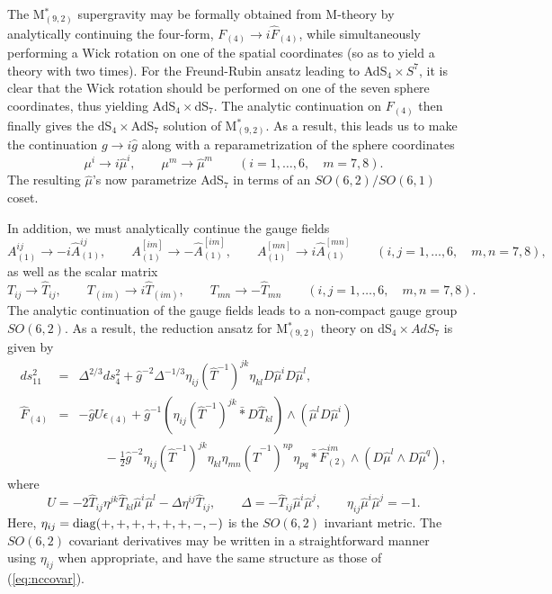 \documentclass[a4paper,12pt]{article}
\begin{document}
The M$^*_{(9,2)}$ supergravity may be formally obtained from M-theory by
analytically continuing the four-form, $F_{(4)}\to i\hat F_{(4)}$, while
simultaneously performing a Wick rotation on one of the spatial
coordinates (so as to yield a theory with two times).  For the
Freund-Rubin ansatz leading to AdS$_4\times S^7$, it is clear that the
Wick rotation should be performed on one of the seven sphere
coordinates, thus yielding AdS$_4\times$dS$_7$.  The analytic
continuation on $F_{(4)}$ then finally gives the dS$_4\times$AdS$_7$
solution of M$^*_{(9,2)}$.  As a result, this leads us to make the
continuation $g\to i\hat g$ along with a reparametrization of the sphere
coordinates
%
\begin{equation}
\mu^i\to i\hat \mu^i,\qquad \mu^m\to\hat\mu^m\qquad
(i=1,\ldots,6,\quad m=7,8).
\end{equation}
%
The resulting $\hat\mu$'s now parametrize AdS$_7$ in terms of an
$SO(6,2)/SO(6,1)$ coset.

In addition, we must analytically continue the gauge fields
%
\begin{equation}
A_{(1)}^{ij}\to -i\hat A_{(1)}^{ij},\qquad
A_{(1)}^{[im]}\to -\hat A_{(1)}^{[im]},\qquad
A_{(1)}^{[mn]}\to i\hat A_{(1)}^{[mn]}\qquad
(i,j=1,\ldots,6,\quad m,n=7,8),
\end{equation}
%
as well as the scalar matrix
%
\begin{equation}
T_{ij}\to \hat T_{ij},\qquad
T_{(im)}\to i\hat T_{(im)},\qquad
T_{mn}\to-\hat T_{mn}\qquad (i,j=1,\ldots,6, \quad m,n=7,8).
\end{equation}
%
The analytic continuation of the gauge fields leads to a non-compact
gauge group $SO(6,2)$.  As a result, the reduction ansatz for
M$^*_{(9,2)}$ theory on dS$_4\times AdS_7$ is given by
%
\begin{eqnarray}
ds^2_{11}&=&\Delta^{2/3}ds_4^2+\hat{g}^{-2}\Delta^{-1/3}
\eta_{ij}(\hat T^{-1})^{jk}\eta_{kl}D\hat\mu^{i}D\hat\mu^{l},\nonumber\\
\hat{F}_{(4)}&=&-\hat{g}U\epsilon_{(4)}
+\hat{g}^{-1}(\eta_{ij}(\hat T^{-1})^{jk}\bar{\ast}D\hat T_{kl})\wedge
(\hat{\mu}^{l}D\hat\mu^{i})\nonumber\\
&&\qquad-\frac{1}{2}\hat{g}^{-2}\eta_{ij}(\hat T^{-1})^{jk}\eta_{kl}
\eta_{mn}(\hat T^{-1})^{np}\eta_{pq}\bar{\ast}
\hat{F}^{im}_{(2)} \wedge (D\hat\mu^{l} \wedge D\hat\mu^{q}),
\label{eq:b4redans}
\end{eqnarray}
%
where
%
\begin{equation}
U=-2\hat T_{ij}\eta^{jk}\hat T_{kl} \hat{\mu}^i \hat{\mu}^l
-\Delta \eta^{ij}\hat T_{ij},\qquad
\Delta=-\hat T_{ij} \hat{\mu}^i \hat{\mu}^j,\qquad
\eta_{ij}\hat{\mu}^i \hat{\mu}^j = -1.
\end{equation}
%
Here, $\eta_{ij}={\rm diag}(+,+,+,+,+,+,-,-)$ is the $SO(6,2)$ invariant
metric.  The $SO(6,2)$ covariant derivatives may be written in a
straightforward manner using $\eta_{ij}$ when appropriate, and have the
same structure as those of (\ref{eq:nccovar}).
\end{document}

